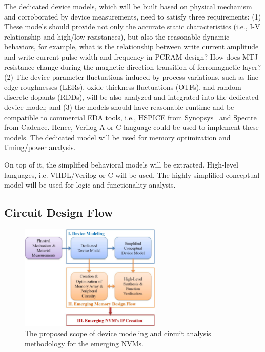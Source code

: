 The dedicated device models, which will be built based on physical mechanism and corroborated by device measurements, need to satisfy three requirements: (1) These models should provide not only the accurate static characteristics (i.e., I-V relationship and high/low resistances), but also the reasonable dynamic behaviors, for example, what is the relationship between write current amplitude and write current pulse width and frequency in PCRAM design? How does MTJ resistance change during the magnetic direction transition of ferromagnetic layer? (2) The device parameter fluctuations induced by process variations, such as line-edge roughnesses (LERs), oxide thickness fluctuations (OTFs), and random discrete dopants (RDDs), will be also analyzed and integrated into the dedicated device model; and (3) the models should have reasonable runtime and be compatible to commercial EDA tools, i.e., HSPICE from Synopsys~\cite{synopsys} and Spectre from Cadence. Hence, Verilog-A or C language could be used to implement these models. The dedicated model will be used for memory optimization and timing/power analysis.  

On top of it, the simplified behavioral models will be extracted. High-level languages, i.e. VHDL/Verilog or C will be used. The highly simplified conceptual model will be used for logic and functionality analysis.

\subsection{Circuit Design Flow}

\begin{figure}\centering \centering   \includegraphics[width=0.6\textwidth]{./figure/HL-flow.pdf}
\caption{The proposed scope of device modeling and circuit analysis methodology for the emerging NVMs.}\label{flow}  \vspace{-20pt}
\end{figure}

